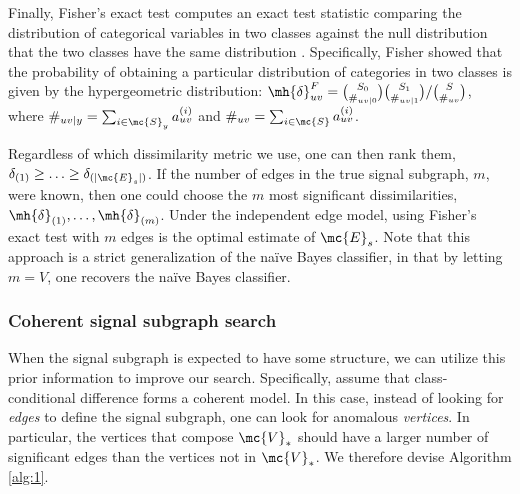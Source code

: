 Finally, Fisher's exact test computes an exact test statistic comparing the distribution of categorical variables in two classes against the null distribution that the two classes have the same distribution \cite{Ross}. Specifically, Fisher showed that the probability of obtaining a particular distribution of categories in two classes is given by the hypergeometric distribution:	$\mh{\delta}_{uv}^F=\binom{S_0}{\#_{uv|0}}\binom{S_1}{\#_{uv|1}}/\binom{S}{\#_{uv}}$, where $\#_{uv|y}=\sum_{i \in \mc{S}_y} a_{uv}^{(i)}$ and $\#_{uv} = \sum_{i \in \mc{S}} a_{uv}^{(i)}$.



 Regardless of which dissimilarity metric we use, one can then rank them,  $\delta_{(1)}\geq  \ldots \geq \delta_{(|\mc{E}_s|)}$.  If the number of edges in the true signal subgraph, $m$, were known, then one could choose the $m$ most significant dissimilarities, $\mh{\delta}_{(1)}, \ldots, \mh{\delta}_{(m)}$.  Under the independent edge model, using Fisher's exact test with $m$ edges is the optimal estimate of $\mc{E}_s$. Note that this approach is a strict generalization of the na\"{i}ve Bayes classifier, in that by letting $m=V$, one recovers the na\"ive Bayes classifier.


\subsubsection{Coherent signal subgraph search} %
\label{sub:utilizing_graph_structure}

When the signal subgraph is expected to have some structure, we can utilize this prior information to improve our search.  Specifically, assume that class-conditional difference forms a coherent model.  In this case, instead of looking for \emph{edges} to define the signal subgraph, one can look for anomalous \emph{vertices}.  In particular, the vertices that compose $\mc{V}_*$ should have a larger number of significant edges than the vertices not in $\mc{V}_*$.  We therefore devise Algorithm \ref{alg:1}.


